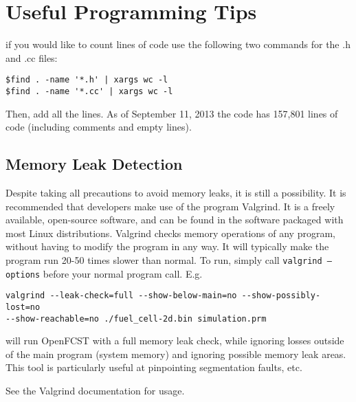 \chapter{Useful Programming Tips}
if you would like to count lines of code use the following two commands for the .h and .cc files:
\begin{lstlisting}
$find . -name '*.h' | xargs wc -l
$find . -name '*.cc' | xargs wc -l
\end{lstlisting}
Then, add all the lines. As of September 11, 2013 the code has 157,801 lines of code (including comments and empty lines).

\section{Memory Leak Detection}

Despite taking all precautions to avoid memory leaks, it is still a possibility. It is recommended that developers make use of the program Valgrind.  It is a freely available, open-source software, and can be found in the software packaged with most Linux distributions.  Valgrind checks memory operations of any program, without having to modify the program in any way.  It will typically make the program run 20-50 times slower than normal.  To run, simply call \texttt{valgrind --options} before your normal program call.  E.g.
\begin{lstlisting}
valgrind --leak-check=full --show-below-main=no --show-possibly-lost=no 
--show-reachable=no ./fuel_cell-2d.bin simulation.prm
\end{lstlisting}
will run OpenFCST with a full memory leak check, while ignoring losses outside of the main program (system memory) and ignoring possible memory leak areas.  This tool is particularly useful at pinpointing segmentation faults, etc.

See the Valgrind documentation for usage.

